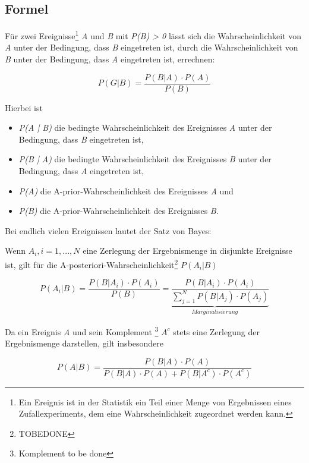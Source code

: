 \subsection{Formel}

Für zwei Ereignisse\footnote{Ein Ereignis ist in der Statistik ein Teil einer Menge von Ergebnissen eines Zufallexperiments, dem eine Wahrscheinlichkeit zugeordnet
    werden kann.} \textit{A} und \textit{B} mit \textit{P(B) > 0} lässt sich die Wahrscheinlichkeit von \textit{A} unter der Bedingung, dass \textit{B} eingetreten
ist, durch die Wahrscheinlichkeit von \textit{B} unter der Bedingung, dass \textit{A} eingetreten ist, errechnen:

\begin{equation}
    P(G | B) = \frac{P(B | A) \cdot P(A)}{P(B)}
\end{equation}

Hierbei ist

\begin{itemize}
    \item \textit{P(A | B)} die bedingte Wahrscheinlichkeit des Ereignisses \textit{A} unter der Bedingung, dass \textit{B} eingetreten ist,
    \item \textit{P(B | A)} die bedingte Wahrscheinlichkeit des Ereignisses \textit{B} unter der Bedingung, dass \textit{A} eingetreten ist,
    \item \textit{P(A)} die A-prior-Wahrscheinlichkeit des Ereignisses \textit{A} und
    \item \textit{P(B)} die A-prior-Wahrscheinlichkeit des Ereignisses \textit{B}.
\end{itemize}

Bei endlich vielen Ereignissen lautet der Satz von Bayes:

Wenn \textit{$A_i, i = 1,..., N$} eine Zerlegung der Ergebnismenge in disjunkte Ereignisse ist, gilt für die A-posteriori-Wahrscheinlichkeit\footnote{TOBEDONE}
\textit{$P(A_i | B)$}

\begin{equation}
    P(A_i | B) = \frac{P(B | A_i) \cdot P(A_i)}{P(B)} \underbrace{= \frac{P(B | A_i) \cdot P(A_i)}{\sum_{j = 1}^{N} P(B | A_j) \cdot P(A_j)}}_{Marginalisierung}
\end{equation}

Da ein Ereignis \textit{A} und sein Komplement \footnote{Komplement to be done} \textit{$A^c$} stets eine Zerlegung der Ergebnismenge darstellen, gilt insbesondere

\begin{equation}
    P(A | B) = \frac{P(B | A) \cdot P(A)}{P(B | A) \cdot P(A) + P(B | A^c) \cdot P(A^c)}
\end{equation}

\cite[S.411f]{Papula:2014}
